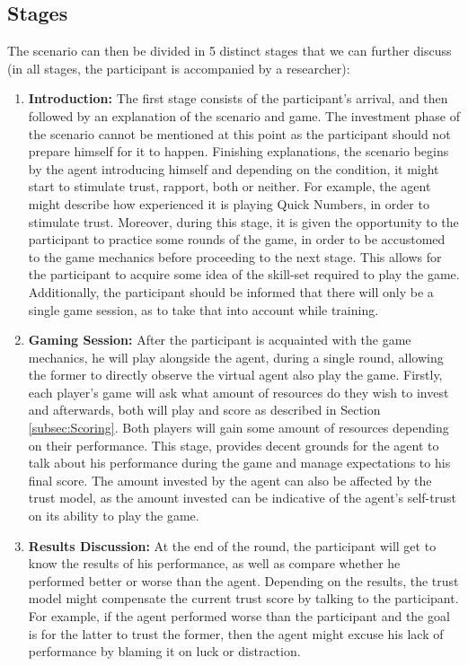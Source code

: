 \subsection{Stages}
\label{sub:stages}
The scenario can then be divided in 5 distinct stages that we can further discuss (in all stages, the participant is accompanied by a researcher):
\begin{enumerate}[label=\textbf{\arabic*.}]
    \item \textbf{Introduction:} The first stage consists of the participant's arrival, and then followed by an explanation of the scenario and game. The investment phase of the scenario cannot be mentioned at this point as the participant should not prepare himself for it to happen. Finishing explanations, the scenario begins by the agent introducing himself and depending on the condition, it might start to stimulate trust, rapport, both or neither. For example, the agent might describe how experienced it is playing Quick Numbers, in order to stimulate trust. Moreover, during this stage, it is given the opportunity to the participant to practice some rounds of the game, in order to be accustomed to the game mechanics before proceeding to the next stage. This allows for the participant to acquire some idea of the skill-set required to play the game. Additionally, the participant should be informed that there will only be a single game session, as to take that into account while training.
    
    \item \textbf{Gaming Session:} After the participant is acquainted with the game mechanics, he will play alongside the agent, during a single round, allowing the former to directly observe the virtual agent also play the game. Firstly, each player's game will ask what amount of resources do they wish to invest and afterwards, both will play and score as described in Section \ref{subsec:Scoring}. Both players will gain some amount of resources depending on their performance. This stage, provides decent grounds for the agent to talk about his performance during the game and manage expectations to his final score. The amount invested by the agent can also be affected by the trust model, as the amount invested can be indicative of the agent's self-trust on its ability to play the game.
    
    \item \textbf{Results Discussion:} At the end of the round, the participant will get to know the results of his performance, as well as compare whether he performed better or worse than the agent. Depending on the results, the trust model might compensate the current trust score by talking to the participant. For example, if the agent performed worse than the participant and the goal is for the latter to trust the former, then the agent might excuse his lack of performance by blaming it on luck or distraction. 
    

\end{enumerate}
